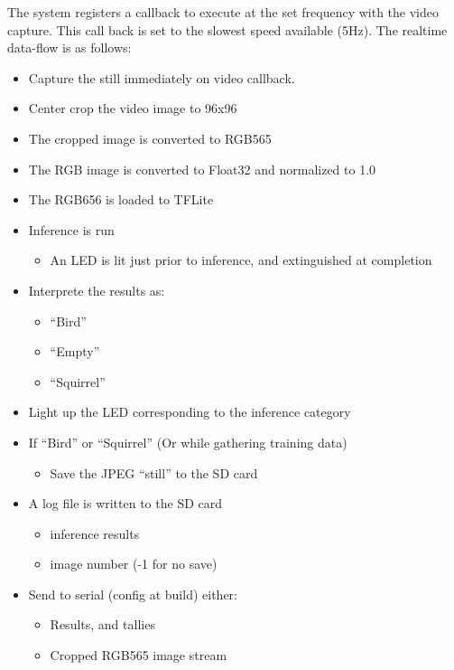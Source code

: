 \documentclass[conference]{IEEEtran}
\begin{document}
The system registers a callback to execute at the set frequency with the video capture. This call back is set to the slowest speed available (5Hz).
The realtime data-flow is as follows:    
\begin{itemize}
     \item Capture the still immediately on video callback.
     \item Center crop the video image to 96x96 
     \item The cropped image is converted to RGB565
     \item The RGB image is converted to Float32 and normalized to 1.0
     \item The RGB656 is loaded to TFLite
     \item Inference is run
     \begin{itemize}
     	\item An LED is lit just prior to inference, and extinguished at completion
     \end{itemize}
     \item Interprete the results as:
     \begin{itemize}
     	\item “Bird”
	\item  “Empty”
	\item “Squirrel”
     \end{itemize}
     \item Light up the LED corresponding to the inference category
     \item If “Bird” or “Squirrel” (Or while gathering training data)
     \begin{itemize}
        \item Save the JPEG “still” to the SD card
     \end{itemize} 
     \item A log file is written to the SD card 
     \begin{itemize}
     	\item inference results
	\item image number (-1 for no save)
     \end{itemize} 
     \item Send to serial (config at build) either:
     \begin{itemize}
        \item  Results, and tallies
        \item Cropped RGB565 image stream
        \end{itemize} 
\end{itemize} 
\end{document}

